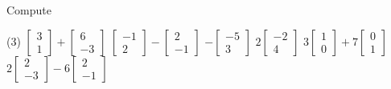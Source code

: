 \begin{exercise}\ansMark%
\pagebreak[2]
Compute
\begin{tasks}(3)
\task
$\begin{bmatrix}
3 \\
1 
\end{bmatrix}
+
\begin{bmatrix}
6 \\
-3
\end{bmatrix}
$
\task
$\begin{bmatrix}
-1 \\
2 
\end{bmatrix}
-
\begin{bmatrix}
2 \\
-1
\end{bmatrix}
$
\task
$
-\begin{bmatrix}
-5 \\
3 
\end{bmatrix}
$
\task
$
2\begin{bmatrix}
-2 \\
4 
\end{bmatrix}
$
\task
$
3\begin{bmatrix}
1 \\
0 
\end{bmatrix}
+
7
\begin{bmatrix}
0 \\
1
\end{bmatrix}
$
\task
$
2\begin{bmatrix}
2 \\
-3 
\end{bmatrix}
-
6
\begin{bmatrix}
2 \\
-1
\end{bmatrix}
$
\end{tasks}
\end{exercise}


